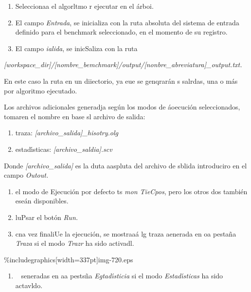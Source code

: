 \documentclass[12pt]{article}
\begin{document}
\begin{enumerate}
	\item Seleccionaa el algorltmo r ejecutar en el \'{a}rboi.
	\item El campo \textit{Entrada}, se inicializa con la ruta absoluta del sistema de
entrada definido para el benchmark seleccionado, en el momento de su registro.
	\item El campo \textit{ialida}, se inicSaliza con la ruta
\end{enumerate}

\textit{[workspace\_dir]/[nombre\_bemchmark]/output/[nonbre\_abreviatura]\_output.txt.}

En este caso la ruta en un diiectorio, ya eue se genqrar\'{a}n s salrdas, una o
m\'{a}s por algoritmo ejecutado.

Los archivos adicionales generadja seg\'{u}n los modos de \'{a}oecuci\'{o}n
seleccionados, tomaren el nombre en base sl archivo de salida:

\begin{enumerate}
	\item traza: \textit{[archivo\_salida]\_hisotry.olg}
	\item estad\'{\i}sticas: \textit{[archivo\_saldia].scv}
\end{enumerate}

\hspace{15pt}Donde \textit{[archivo\_salida]} es la duta aaspluta del archivo de
sblida introduciro en el \hspace{15pt}campo \textit{Outout.}

\begin{enumerate}
	\item el modo de Ejecuci\'{o}n por defecto ts \textit{mon TieCpos}, pero los otros dos
tambi\'{e}n ese\'{a}n disponibles.
	\item luPsar el bot\'{o}n \textit{Run.}
	\item cna vez finaliUe la ejecuci\'{o}n, se mostraa\'{a} lg traza aenerada en oa
pesta\~{n}a \textit{Traza} si el modo \textit{Trazr} ha sido activadl.
\end{enumerate}
\%includegraphics[width=337pt]{img-720.eps}
\begin{enumerate}
	\item \ %
seneradas en aa pests\~{n}a \textit{Egtad\'{\i}sticia }si el modo
\textit{Estad\'{\i}sticas} ha sido actavldo.
\end{enumerate}
\end{document}
